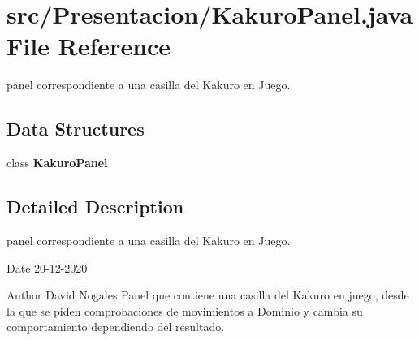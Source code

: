 \section{src/\+Presentacion/\+Kakuro\+Panel.java File Reference}
\label{_kakuro_panel_8java}


panel correspondiente a una casilla del Kakuro en Juego.  


\subsection*{Data Structures}
\begin{DoxyCompactItemize}
\item 
class {\bfseries Kakuro\+Panel}
\end{DoxyCompactItemize}


\subsection{Detailed Description}
panel correspondiente a una casilla del Kakuro en Juego. 

\begin{DoxyDate}{Date}
20-\/12-\/2020 
\end{DoxyDate}
\begin{DoxyAuthor}{Author}
David Nogales Panel que contiene una casilla del Kakuro en juego, desde la que se piden comprobaciones de movimientos a Dominio y cambia su comportamiento dependiendo del resultado. 
\end{DoxyAuthor}
